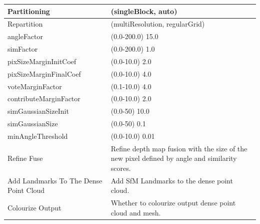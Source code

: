 \documentclass[12pt]{report}
\begin{document}
\begin{table}[H]
{\begin{tabular}{|l|l|}
    Partitioning                              & (singleBlock, auto)                                                                      \\ \hline
    Repartition                               & (multiResolution, regularGrid)                                                           \\ \hline
    angleFactor                               & (0.0-200.0) 15.0                                                                         \\ \hline
    simFactor                                 & (0.0-200.0) 1.0                                                                          \\ \hline
    pixSizeMarginInitCoef                     & (0.0-10.0) 2.0                                                                           \\ \hline
    pixSizeMarginFinalCoef                    & (0.0-10.0) 4.0                                                                           \\ \hline
    voteMarginFactor                          & (0.1-10.0) 4.0                                                                           \\ \hline
    contributeMarginFactor                    & (0.0-10.0) 2.0                                                                           \\ \hline
    simGaussianSizeInit                       & (0.0-50) 10.0                                                                            \\ \hline
    simGaussianSize                           & (0.0-50) 0.1                                                                             \\ \hline
    minAngleThreshold                         & (0.0-10.0) 0.01                                                                          \\ \hline
    Refine Fuse                               & Refine depth map fusion with the size of the new pixel defined by angle and similarity scores. \\ \hline
    Add Landmarks To The Dense Point Cloud    & Add SfM Landmarks to the dense point cloud.                                              \\ \hline
    Colourize Output                           & Whether to colourize output dense point cloud and mesh.                                   \\ \hline

\end{tabular}}
\end{table}
\end{document}
